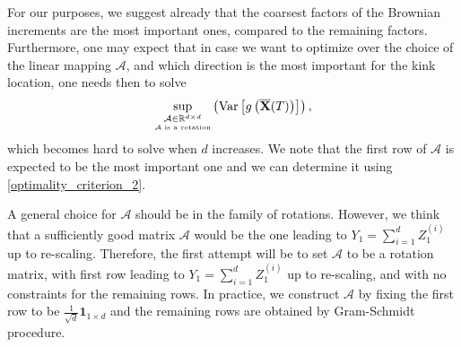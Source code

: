 \begin{remark}
For our purposes, we suggest already that the coarsest factors of the Brownian increments are the most important ones, compared to the remaining factors. Furthermore, one may expect that in case we want to optimize over the choice of the linear mapping $\mathcal{A}$, and which direction is the most important for the kink location, one needs then to solve
\begin{align}\label{transformation_optimality_criterion}
\underset{\underset{\mathcal{A} \text{ is a rotation}} {\mathcal{A} \in \mathbb{R}^{d \times d}}}{\operatorname{\sup}} \left( \text{Var}\left[g \left(\overline{\mathbf{X}}(T) \right)\right] \right) ,
\end{align}
which becomes hard to solve  when $d$ increases. We note that the first row of $\mathcal{A}$ is expected to be the most important one and we can determine it using \eqref{optimality_criterion_2}.
\end{remark}

\begin{remark}
A general choice for $\mathcal{A}$ should be in the family of rotations. However, we think that a sufficiently good matrix $\mathcal{A}$ would be the one leading to $Y_1=\sum_{i=1}^d Z_1^{(i)}$ up to re-scaling. Therefore, the first attempt will be  to  set $\mathcal{A}$ to be a  rotation matrix, with first  row leading to $Y_1=\sum_{i=1}^d Z_1^{(i)}$ up to re-scaling, and with no constraints for the remaining rows. In practice, we construct $\mathcal{A}$ by fixing the first row to be $\frac{1}{\sqrt{d}} \mathbf{1}_{1 \times d}$ and the remaining rows are obtained by Gram-Schmidt procedure.
\end{remark}


